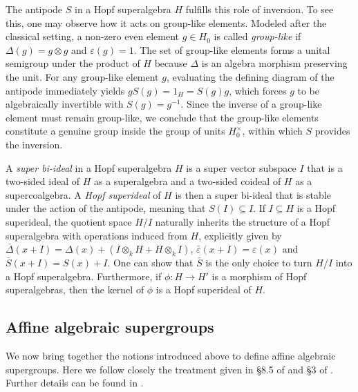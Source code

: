 \documentclass[11pt,a4paper,reqno,noamsfonts]{amsart}
\numberwithin{equation}{section}
\theoremstyle{definition}
\theoremstyle{remark}
\begin{document}
The antipode $S$ in a Hopf superalgebra $H$ fulfills this role of inversion. To see this, one may observe how it acts on group-like elements. Modeled after the classical setting, a non-zero even element $g \in H_0$ is called \emph{group-like} if $\Delta(g) = g \otimes g$ and $\varepsilon(g) = 1$. The set of group-like elements forms a unital semigroup under the product of $H$ because $\Delta $ is an algebra morphism preserving the unit. For any group-like element $g$, evaluating the defining diagram of the antipode immediately yields $g S(g) = 1_H = S(g) g$, which forces $g$ to be algebraically invertible with $S(g) = g^{-1}$. Since the inverse of a group-like element must remain group-like, we conclude that the group-like elements constitute a genuine group inside the group of units $H_0^{\times}$, within which $S$ provides the inversion.

A \emph{super bi-ideal} in a Hopf superalgebra $H$ is a super vector subspace $I$ that is a two-sided ideal of $H$ as a superalgebra and a two-sided coideal of $H$ as a supercoalgebra. A \emph{Hopf superideal} of $H$ is then a super bi-ideal that is stable under the action of the antipode, meaning that $S(I) \subseteq I$. If $I \subseteq H$ is a Hopf superideal, the quotient space $H/I$ naturally inherits the structure of a Hopf superalgebra with operations induced from $H$, explicitly given by $\bar{\Delta} (x + I) = \Delta(x) +  (I \otimes_k H + H \otimes_k I)$, $\bar{\varepsilon}(x + I) = \varepsilon(x)$ and $\bar{S}(x+I) = S(x) + I$. One can show that $\bar{S}$ is the only choice to turn $H/I$ into a Hopf superalgebra. Furthermore, if $\phi \colon H \to H'$ is a morphism of Hopf superalgebras, then the kernel of $\phi$ is a Hopf superideal of $H$. 

%
\subsection{Affine algebraic supergroups}\label{sec:2.4}
We now bring together the notions introduced above to define affine algebraic supergroups. Here we follow closely the treatment given in \S8.5 of \cite{Westra2009} and \S3 of \cite{MasuokaTakahashi2021}. Further details can be found in \cite{FioresiLledo2004,Fioresi2008,Zubkov2009,MasuokaZubkov2011,BovdiZubkov2023}. 
\end{document}
